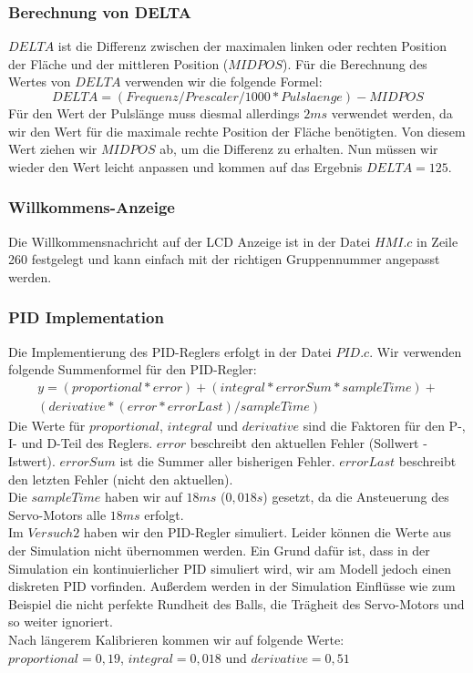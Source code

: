\subsubsection{Berechnung von DELTA}
$DELTA$ ist die Differenz zwischen der maximalen linken oder rechten Position der Fläche und der mittleren Position ($MIDPOS$). Für die Berechnung des Wertes von $DELTA$ verwenden wir die folgende Formel:
\begin{equation}
DELTA = (Frequenz / Prescaler / 1000 * Pulslaenge) - MIDPOS
\end{equation}
Für den Wert der Pulslänge muss diesmal allerdings $2 ms$ verwendet werden, da wir den Wert für die maximale rechte Position der Fläche benötigten. Von diesem Wert ziehen wir $MIDPOS$ ab, um die Differenz zu erhalten. Nun müssen wir wieder den Wert leicht anpassen und kommen auf das Ergebnis $DELTA = 125$.

\subsubsection{Willkommens-Anzeige}
Die Willkommensnachricht auf der LCD Anzeige ist in der Datei $HMI.c$ in Zeile 260 festgelegt und kann einfach mit der richtigen Gruppennummer angepasst werden.

\subsubsection{PID Implementation}
Die Implementierung des PID-Reglers erfolgt in der Datei $PID.c$. Wir verwenden folgende Summenformel für den PID-Regler:
\begin{multline}
y = (proportional * error) + (integral * errorSum * sampleTime) + \\
(derivative * (error * errorLast) / sampleTime)
\end{multline}
Die Werte für $proportional$, $integral$ und $derivative$ sind die Faktoren für den P-, I- und D-Teil des Reglers. $error$ beschreibt den aktuellen Fehler (Sollwert - Istwert). $errorSum$ ist die Summer aller bisherigen Fehler. $errorLast$ beschreibt den letzten Fehler (nicht den aktuellen). \\
Die $sampleTime$ haben wir auf $18 ms$ ($0,018s$) gesetzt, da die Ansteuerung des Servo-Motors alle $18 ms$ erfolgt. \\
Im $Versuch 2$ haben wir den PID-Regler simuliert. Leider können die Werte aus der Simulation nicht übernommen werden. Ein Grund dafür ist, dass in der Simulation ein kontinuierlicher PID simuliert wird, wir am Modell jedoch einen diskreten PID vorfinden. Außerdem werden in der Simulation Einflüsse wie zum Beispiel die nicht perfekte Rundheit des Balls, die Trägheit des Servo-Motors und so weiter ignoriert. \\
Nach längerem Kalibrieren kommen wir auf folgende Werte: \\
$proportional = 0,19$, $integral =0,018$ und $derivative = 0,51$


